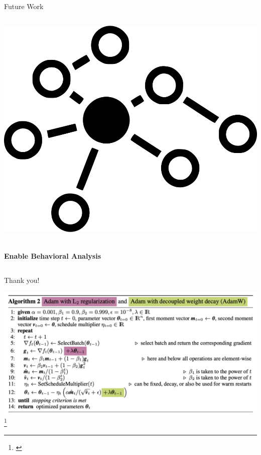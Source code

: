 \documentclass[serif]{beamer}  %
\begin{document}
\begin{frame}{Future Work}
\begin{columns}[T,totalwidth=\textwidth]
        \begin{column}{0.32\textwidth}
            \centering
            \vspace{1em}
            \includegraphics[width=0.6\linewidth]{images/graph_icon.png}
            \vspace{1em}
            \parbox{\linewidth}{\centering\textbf{\\Enable Behavioral Analysis}}
        \end{column}
        
    \end{columns}
    
\end{frame}

\begin{frame}
\centering
{\Huge Thank you!}
\end{frame}

\begin{frame}
    \centering
    \includegraphics[width=\textwidth]{images/adamw_algo.png}
    \footnote{\cite{loshchilov2019decoupledweightdecayregularization}}
    \end{frame}
    
\end{document}
